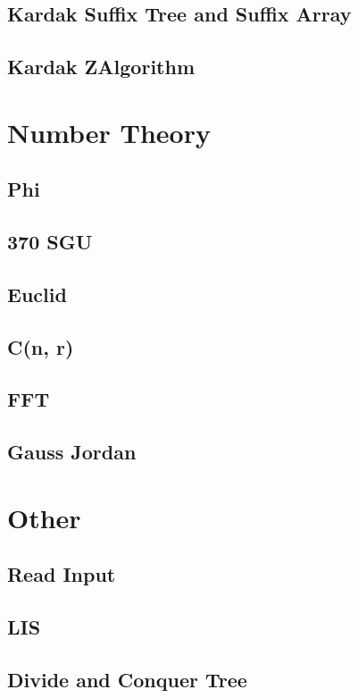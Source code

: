 \documentclass[a4paper,landscape]{article}
\begin{document}
\begin{multicols}{2}
\subsection{Kardak Suffix Tree and Suffix Array}
	
\subsection{Kardak ZAlgorithm}
	

\section{Number Theory}
\subsection{Phi}
	
\subsection{370 SGU}
	
\subsection{Euclid}
	
\subsection{C(n, r)}
	
\subsection{FFT}
	
\subsection{Gauss Jordan}
	

\section{Other}
\subsection{Read Input}
	
\subsection{LIS}
	
\subsection{Divide and Conquer Tree}
	

\end{multicols}
\end{document}
